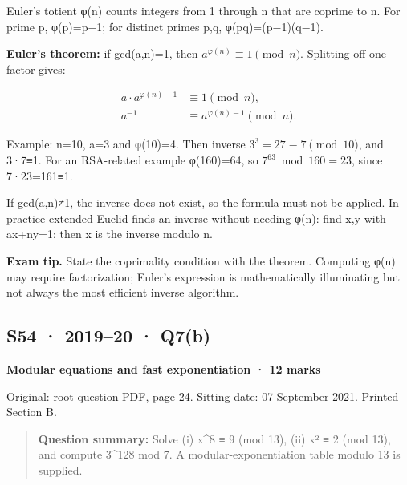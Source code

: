 \documentclass[11pt,a4paper]{article}
\begin{document}
Euler’s totient φ(n) counts integers from 1 through n that are coprime to n. For prime p,\allowbreak{} φ(p)=\allowbreak{}p−1; for distinct primes p,\allowbreak{}q,\allowbreak{} φ(pq)=\allowbreak{}(p−1)(q−1).


\textbf{Euler’s theorem:} if gcd(a,\allowbreak{}n)=\allowbreak{}1,\allowbreak{} then \(a^{\varphi(n)}\equiv1\pmod n\). Splitting off one factor gives:



\[
\begin{aligned}a\cdot a^{\varphi(n)-1}&\equiv1\pmod n,\\a^{-1}&\equiv a^{\varphi(n)-1}\pmod n.\end{aligned}
\]

Example: n=\allowbreak{}10,\allowbreak{} a=\allowbreak{}3 and φ(10)=\allowbreak{}4. Then inverse \(3^3=27\equiv7\pmod{10}\),\allowbreak{} and 3·7≡1. For an RSA-related example φ(160)=\allowbreak{}64,\allowbreak{} so \(7^{63}\bmod160=23\),\allowbreak{} since 7·23=\allowbreak{}161≡1.


If gcd(a,\allowbreak{}n)≠1,\allowbreak{} the inverse does not exist,\allowbreak{} so the formula must not be applied. In practice extended Euclid finds an inverse without needing φ(n): find x,\allowbreak{}y with ax+ny=\allowbreak{}1; then x is the inverse modulo n.



{\color{ForestGreen}\textbf{Exam tip.} State the coprimality condition with the theorem. Computing φ(n) may require factorization; Euler’s expression is mathematically illuminating but not always the most efficient inverse algorithm.}




\clearpage
\subsection{S54 · 2019–20 · Q7(b)}\label{s54}

\textbf{Modular equations and fast exponentiation · 12 marks}


Original: \href{../../CSE405-Security_Merged.pdf\#page=24}{root question PDF,\allowbreak{} page 24}. Sitting date: 07 September 2021. Printed Section B.



\begin{quote}\small

\textbf{Question summary:} Solve (i) x\textasciicircum{}8 ≡ 9 (mod 13),\allowbreak{} (ii) x² ≡ 2 (mod 13),\allowbreak{} and compute 3\textasciicircum{}128 mod 7. A modular-exponentiation table modulo 13 is supplied.



\end{quote}
\end{document}
